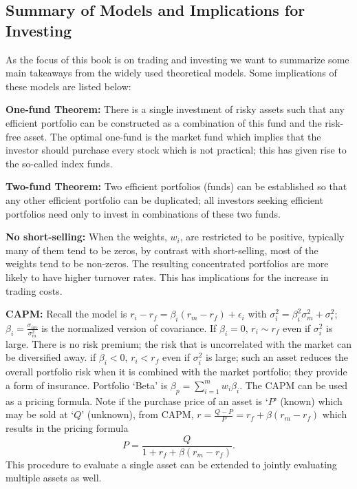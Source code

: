 \subsection{Summary of Models and Implications for Investing}


As the focus of this book is on trading and investing we want to summarize some main takeaways from the widely used theoretical models. Some implications of these models are listed below: \twomedskip


\noindent\textbf{One-fund Theorem:} There is a single investment of risky assets such that any efficient portfolio can be constructed as a combination of this fund and the risk-free asset. The optimal one-fund is the market fund which implies that the investor should purchase every stock which is not practical; this has given rise to the so-called index funds. \twomedskip


\noindent\textbf{Two-fund Theorem:} Two efficient portfolios (funds) can be established so that any other efficient portfolio can be duplicated; all investors seeking efficient portfolios need only to invest in combinations of these two funds. \twomedskip


\noindent\textbf{No short-selling:} When the weights, $w_i$, are restricted to be positive, typically many of them tend to be zeros, by contrast with short-selling, most of the weights tend to be non-zeros. The resulting concentrated portfolios are more likely to have higher turnover rates. This has implications for the increase in trading costs. \twomedskip


\noindent\textbf{CAPM:} Recall the model is $r_i - r_f= \beta_i (r_m-r_f)+\epsilon_i$ with $\sigma_i^2= \beta_i^2\sigma^2_m + \sigma_\epsilon^2$; $\beta_i= \frac{\sigma_{im}}{\sigma_m^2}$ is the normalized version of covariance. If $\beta_i= 0$, $r_i \sim r_f$ even if $\sigma_i^2$ is large. There is no risk premium; the risk that is uncorrelated with the market can be diversified away. if $\beta_i < 0$, $r_i<r_f$ even if $\sigma_i^2$ is large; such an asset reduces the overall portfolio risk when it is combined with the market portfolio; they provide a form of insurance. Portfolio `Beta' is $\beta_p= \sum_{i=1}^m w_i \beta_i$. The CAPM can be used as a pricing formula. Note if the purchase price of an asset is `$P$' (known) which may be sold at `$Q$' (unknown), from CAPM, $r= \frac{Q-P}{P}= r_f+\beta(r_m - r_f)$ which results in the pricing formula
	\begin{equation}\label{eqn:pricing}
	P=\dfrac{Q}{1 + r_f + \beta(r_m - r_f)}.
	\end{equation}
This procedure to evaluate a single asset can be extended to jointly evaluating multiple assets as well. \twomedskip


